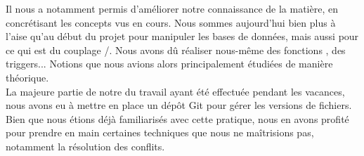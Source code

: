 \documentclass[a4paper,10pt]{report}
\begin{document}
Il nous a notamment permis d'améliorer notre connaissance de la matière, en concrétisant les concepts vus en cours. Nous sommes aujourd'hui bien plus à l'aise qu'au début du projet pour manipuler les bases de données, mais aussi pour ce qui est du couplage /. Nous avons dû réaliser nous-même des fonctions , des triggers... Notions que nous avions alors principalement étudiées de manière théorique.\\

La majeure partie de notre du travail ayant été effectuée pendant les vacances, nous avons eu à mettre en place un dépôt Git pour gérer les versions de fichiers. Bien que nous étions déjà familiarisés avec cette pratique, nous en avons profité pour prendre en main certaines techniques que nous ne maîtrisions pas, notamment la résolution des conflits. \\ 
\end{document}
